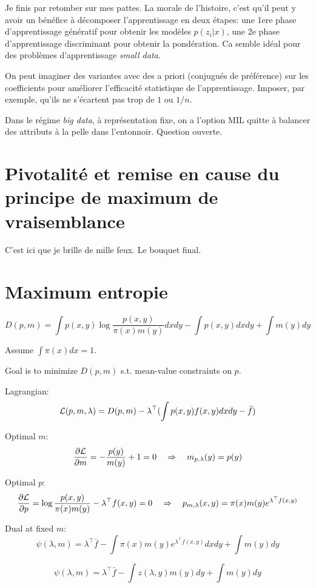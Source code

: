 \documentclass{article}
\begin{document}
Je finis par retomber sur mes pattes. La morale de l'histoire, c'est qu'il peut y avoir un b\'en\'efice \`a  d\'ecomposer l'apprentissage en deux \'etapes: une 1ere phase d'apprentissage g\'en\'eratif pour obtenir les mod\`eles $p(z_i|x)$, une 2e phase d'apprentissage discriminant pour obtenir la pond\'eration. Ca semble id\'eal pour des probl\`emes d'apprentissage {\em small data}. 

On peut imaginer des variantes avec des a priori (conjugu\'es de pr\'ef\'erence) sur les coefficients pour am\'eliorer l'efficacit\'e statistique de l'apprentissage. Imposer, par exemple, qu'ils ne s'\'ecartent pas trop de $1$ ou $1/n$. 

Dans le r\'egime {\em big data}, \`a repr\'esentation fixe, on a l'option MIL quitte \`a balancer des attributs \`a la pelle dans l'entonnoir. Question ouverte. 




\section{Pivotalit\'e et remise en cause du principe de maximum de vraisemblance}

C'est ici que je brille de mille feux. Le bouquet final.


\section{Maximum entropie}

$$
D(p,m) 
= \int p(x,y) \log \frac{p(x,y)}{\pi(x)m(y)} dxdy
- \int p(x,y)dx dy
+ \int m(y) dy
$$

Assume $\int\pi(x)dx=1$.

Goal is to minimize $D(p,m)$ s.t. mean-value constraints on $p$. 

Lagrangian:
$$
{\cal L}(p,m,\lambda) = D(p,m) -\lambda^\top (\int p(x,y)f(x,y)dxdy - \bar{f})
$$

Optimal $m$:
$$
\frac{\partial{\cal L}}{\partial m}
=
- \frac{p(y)}{m(y)} + 1
= 0
\quad
\Rightarrow
\quad
m_{p,\lambda}(y) = p(y)
$$

Optimal $p$:
$$
\frac{\partial{\cal L}}{\partial p}
=
\log \frac{p(x,y)}{\pi(x)m(y)} - \lambda^\top f(x,y)
= 0
\quad
\Rightarrow
\quad
p_{m,\lambda}(x,y) = \pi(x)m(y) e^{\lambda^\top f(x,y)}
$$

Dual at fixed $m$:
$$
\psi(\lambda,m) = \lambda^\top \bar{f} - \int \pi(x)m(y) e^{\lambda^\top  f(x,y)} dxdy + \int m(y) dy
$$

$$
\psi(\lambda,m) = \lambda^\top \bar{f} - \int z(\lambda, y) m(y) dy + \int m(y) dy
$$
\end{document}
